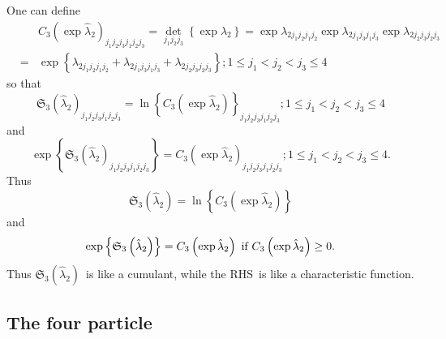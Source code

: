 \documentclass[12pt]{article}
\begin{document}
One can define 
\begin{eqnarray*}
&&C_{3}\left( \exp \hat{\lambda}_{2}\right)
_{j_{1}j_{2}j_{3}j_{1}j_{2}j_{3}}=\det_{j_{1}j_{2}j_{3}}\left\{ \exp \lambda
_{2}\right\} =\exp \lambda _{2j_{1}j_{2}j_{1}j_{2}}\exp \lambda
_{2j_{1}j_{3}j_{1}j_{3}}\exp \lambda _{2j_{2}j_{3}j_{2}j_{3}} \\
&=&\exp \left\{ \lambda _{2j_{1}j_{2}j_{1}j_{2}}+\lambda
_{2j_{1}j_{3}j_{1}j_{3}}+\lambda _{2j_{2}j_{3}j_{2}j_{3}}\right\} ;1\leq
j_{1}<j_{2}<j_{3}\leq 4
\end{eqnarray*}%
so that%
\begin{equation*}
\mathfrak{S}_{3}\left( \hat{\lambda}_{2}\right)
_{j_{1}j_{2}j_{3}j_{1}j_{2}j_{3}}=\ln \left\{ C_{3}\left( \exp \hat{\lambda}%
_{2}\right) \right\} _{j_{1}j_{2}j_{3}j_{1}j_{2}j_{3}};1\leq
j_{1}<j_{2}<j_{3}\leq 4
\end{equation*}%
and 
\begin{equation*}
\exp \left\{ \mathfrak{S}_{3}\left( \hat{\lambda}_{2}\right)
_{j_{1}j_{2}j_{3}j_{1}j_{2}j_{3}}\right\} =C_{3}\left( \exp \hat{\lambda}%
_{2}\right) _{j_{1}j_{2}j_{3}j_{1}j_{2}j_{3}};1\leq j_{1}<j_{2}<j_{3}\leq 4.
\end{equation*}%
Thus 
\begin{equation*}
\mathfrak{S}_{3}\left( \hat{\lambda}_{2}\right) =\ln \left\{ C_{3}\left(
\exp \hat{\lambda}_{2}\right) \right\}
\end{equation*}%
and 
\begin{equation*}
\exp \left\{ \mathfrak{S}_{3}\left( \hat{\lambda}_{2}\right) \right\}
=C_{3}\left( \exp \hat{\lambda}_{2}\right) \text{ if }C_{3}\left( \exp \hat{%
\lambda}_{2}\right) \geq 0.
\end{equation*}%
Thus $\mathfrak{S}_{3}\left( \hat{\lambda}_{2}\right) $\ is like a cumulant,
while the RHS\ is like a characteristic function.

\subsection{The four particle}
\end{document}
